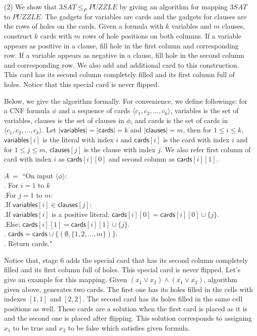 \documentclass[12pt]{article}
\begin{document}
(2) We show that $3SAT \leq_P PUZZLE$ by giving an algorithm for mapping $3SAT$ to $PUZZLE$. The gadgets for variables are cards and the gadgets for clauses are the rows of holes on the cards. Given a formula with $k$ variables and $m$ clauses, construct $k$ cards with $m$ rows of hole positions on both columns. If a variable appears as positive in a clause, fill hole in the first column and corresponding row. If a variable appears as negative in a clause, fill hole in the second column and corresponding row. We also add and additional card to this construction. This card has its second column completely filled and its first column full of holes. Notice that this special card is never flipped.

Below, we give the algorithm formally. For convenience, we define followings: for a CNF formula $\phi$ and a sequence of cards $\langle c_1, c_2, \ldots, c_k \rangle$, \textsf{variables} is the set of variables, \textsf{clauses} is the set of clauses in $\phi$, and \textsf{cards} is the set of cards in $\langle c_1, c_2, \ldots, c_k \rangle$. Let $|\textsf{variables}| = |\textsf{cards}| = k$ and $|\textsf{clauses}| = m$, then for $1 \leq i \leq k$, $\textsf{variables}[i]$ is the literal with index $i$ and $\textsf{cards}[i]$ is the card with index $i$ and for $1 \leq j \leq m$, $\textsf{clauses}[j]$ is the clause with index $j$. We also refer first column of card with index $i$ as $\textsf{cards}[i][0]$ and second column as $\textsf{cards}[i][1]$.


$A \ =$ ``On input $\langle \phi \rangle$:\\
	\indent{}. For $i = 1$ to $k$\\
	\indent{}.\indent\indent For $j = 1$ to $m$:\\
	\indent{}.\indent\indent\indent\indent If $\textsf{variables}[i] \in \textsf{clauses}[j]$:\\
	\indent{}.\indent\indent\indent\indent\indent\indent If $\textsf{variables}[i]$ is a positive literal: $\textsf{cards}[i][0] = \textsf{cards}[i][0] \cup \{j\}$.\\
	\indent{}.\indent\indent\indent\indent\indent\indent Else: $\textsf{cards}[i][1] = \textsf{cards}[i][1] \cup \{j\}$.\\
	\indent{}. $\textsf{cards} = \textsf{cards} \cup \{(\emptyset, \{1, 2, \ldots, m\})\}$.\\
	\indent{}. Return \textsf{cards}."
	
Notice that, stage 6 adds the special card that has its second column completely filled and its first column full of holes. This special card is never flipped. Let's give an example for this mapping. Given $(x_1 \lor x_2) \land (\overline{x_1} \lor \overline{x_2})$, algorithm given above, generates two cards. The first one has its holes filled in the cells with indexes $[1, 1]$ and $[2, 2]$. The second card has its holes filled in the same cell positions as well. These cards are a solution when the first card is placed as it is and the second one is placed after flipping. This solution corresponds to assigning $x_1$ to be true and $x_2$ to be false which satisfies given formula.
\end{document}
